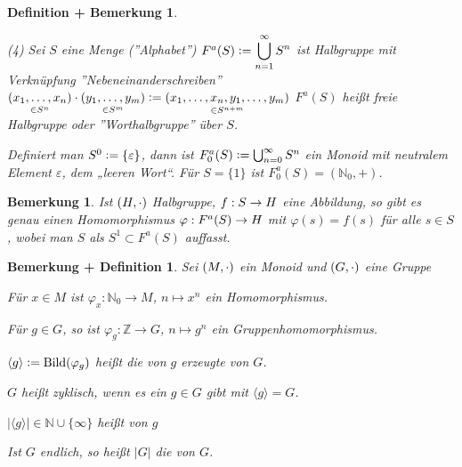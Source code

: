 \documentclass[a4paper,10pt,german]{scrbook}
\theoremstyle{saetze}
\theoremstyle{definitionen}
\newtheorem{DefBem}[Def]{Definition + Bemerkung}
\newtheorem{Bem}[Def]{Bemerkung}
\newtheorem{BemDef}[Def]{Bemerkung + Definition}
\begin{document}
\begin{DefBem}
\begin{enum}
\end{enum}
\begin{enum}
\item[(4)] Sei $S$ eine Menge (''Alphabet'') $F^a(S) \mathrel{\mathop:}=
\displaystyle \bigcup^{\infty}_{n=1} S^n$ ist Halbgruppe mit Verknüpfung
''Nebeneinanderschreiben'' $\underset{\in S^n}{(x_1,\dots,x_n)}\cdot
\underset{\in S^m}{(y_1,\dots,y_m)} \mathrel{\mathop:}= \underset{\in
S^{n+m}}{(x_1, \dots, x_n, y_1, \dots, y_m)}$ $F^a(S)$ heißt freie Halbgruppe oder ''Worthalbgruppe'' über
$S$.

Definiert man $S^0 \mathrel{\mathop:}= \{\varepsilon\}$, dann ist $F_0^a(S) \mathrel{\mathop:}= \bigcup_{n=0}^\infty S^n$ ein Monoid mit neutralem Element $\varepsilon$, dem „leeren Wort“. Für $S=\{1\}$ ist $F_0^a(S) = (\mathbb N_0,+)$.
\end{enum}
\end{DefBem}

\begin{Bem} 
Ist $(H,\cdot)$ Halbgruppe, $f:S\rightarrow H$ eine
Abbildung, so gibt es genau einen Homomorphismus $\varphi:F^a(S) \rightarrow H$
mit $\varphi(s) = f(s)$ für alle $s\in S$, wobei man $S$ als $S^1\subset F^a(S)$ auffasst.

\end{Bem}

\begin{BemDef}
\label{1.9}
Sei $(M,\cdot)$ ein Monoid und $(G,\cdot)$ eine Gruppe
\begin{enum} 

\item Für $x \in M$ ist $\varphi_x: \mathbb{N}_0
\to M$, $n \mapsto x^n$ ein Homomorphismus.

\item Für $g \in G$, so ist $\varphi_g: \mathbb{Z} \to G$, $n \mapsto g^n$
ein Gruppenhomomorphismus.

\item $\langle g \rangle \mathrel{\mathop:}= \mathop{\rm Bild}\nolimits(\varphi_g)$ heißt die von
$g$ erzeugte  von $G$.

\item $G$ heißt zyklisch, wenn es ein $g\in G$ gibt mit $\langle g\rangle =G$.

\item $| \langle g \rangle |\in \mathbb N\cup\{\infty\}$ heißt  von $g$

\item Ist $G$ endlich, so heißt $| G |$ die  von $G$.
\end{enum}


\end{BemDef}
\end{document}
